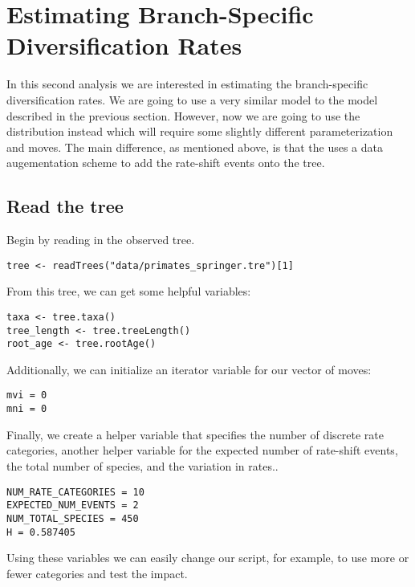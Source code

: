 







\bigskip
\section{Estimating Branch-Specific Diversification Rates}

In this second analysis we are interested in estimating the branch-specific diversification rates.
We are going to use a very similar model to the model described in the previous section.
However, now we are going to use the  distribution instead which will require some slightly different parameterization and moves.
The main difference, as mentioned above, is that the  uses a data augementation scheme to add the rate-shift events onto the tree.

\subsection{Read the tree}

Begin by reading in the observed tree. 

{\tt \begin{snugshade*}
\begin{lstlisting}
tree <- readTrees("data/primates_springer.tre")[1]
\end{lstlisting}
\end{snugshade*}}

From this tree, we can get some helpful variables:
{\tt \begin{snugshade*}
\begin{lstlisting}
taxa <- tree.taxa()
tree_length <- tree.treeLength()
root_age <- tree.rootAge()
\end{lstlisting}
\end{snugshade*}}

Additionally, we can initialize an iterator variable for our vector of moves:
{\tt \begin{snugshade*}
\begin{lstlisting}
mvi = 0
mni = 0
\end{lstlisting}
\end{snugshade*}}

Finally, we create a helper variable that specifies the number of discrete rate categories, another helper variable for the expected number of rate-shift events, the total number of species, and the variation in rates..
{\tt \begin{snugshade*}
\begin{lstlisting}
NUM_RATE_CATEGORIES = 10
EXPECTED_NUM_EVENTS = 2
NUM_TOTAL_SPECIES = 450
H = 0.587405
\end{lstlisting}
\end{snugshade*}}
Using these variables we can easily change our script, for example, to use more or fewer categories and test the impact.



